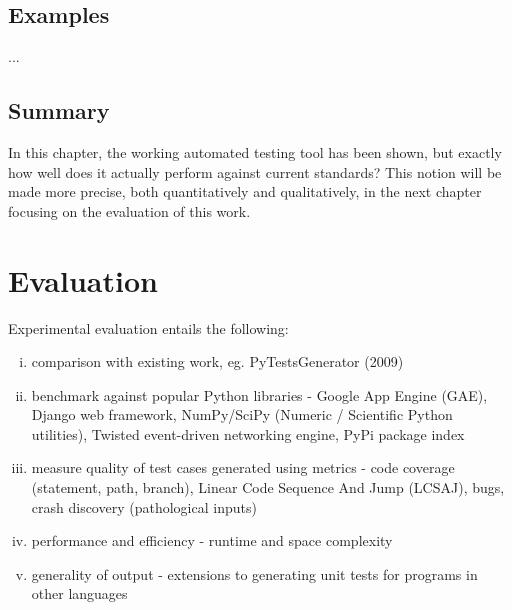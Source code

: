 \documentclass{icldt}
\numberwithin{equation}{section}       %
\begin{document}
\section{Examples}
...
\section{Summary}
In this chapter, the working automated testing tool has been shown, but exactly how well does it actually perform against current standards? This notion will be made more precise, both quantitatively and qualitatively, in the next chapter focusing on the evaluation of this work.
\chapter{Evaluation}
\label{ch:eval}
\begin{comment}
\begin{itemize}
	\item How to measure success?
	\item Which aspects (qualitative eg. ease of use/quantitative), and how to measure?
	\item What functionality to demonstrate?
	\item What experiments to undertake, and what outcome constitutes success?
	\item Which tests/benchmarks, and results?
	\item Comparison with existing work?
	\item Contribution to extending state of the art?
\end{itemize}
\end{comment}

Experimental evaluation entails the following:
\begin{enumerate}[i.]
	\item comparison with existing work, eg. PyTestsGenerator (2009)
	\item benchmark against popular Python libraries - Google App Engine (GAE), Django web framework, NumPy/SciPy (Numeric / Scientific Python utilities), Twisted event-driven networking engine, PyPi package index
	\item measure quality of test cases generated using metrics - code coverage (statement, path, branch), Linear Code Sequence And Jump (LCSAJ), bugs, crash discovery (pathological inputs)
	\item performance and efficiency - runtime and space complexity
	\item generality of output - extensions to generating unit tests for programs in other languages
\end{enumerate}
\end{document}
